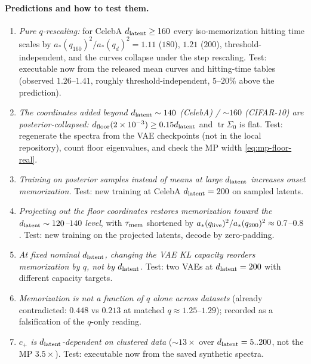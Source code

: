 \paragraph{Predictions and how to test them.}
\begin{enumerate}
\item \emph{Pure $q$-rescaling:} for CelebA $d_{\mathrm{latent}}\ge160$ every iso-memorization hitting time scales by $a_*(q_{160})^2/a_*(q_d)^2=1.11$ ($180$), $1.21$ ($200$), threshold-independent, and the curves collapse under the step rescaling. Test: executable now from the released mean curves and hitting-time tables (observed $1.26$--$1.41$, roughly threshold-independent, $5$--$20\%$ above the prediction).
\item \emph{The coordinates added beyond $d_{\mathrm{latent}}\sim140$ (CelebA) / $\sim160$ (CIFAR-10) are posterior-collapsed:} $d_{\mathrm{floor}}(2\times10^{-3})\ge0.15d_{\mathrm{latent}}$ and $\operatorname{tr}\Sigma_0$ is flat. Test: regenerate the spectra from the VAE checkpoints (not in the local repository), count floor eigenvalues, and check the MP width \eqref{eq:mp-floor-real}.
\item \emph{Training on posterior samples instead of means at large $d_{\mathrm{latent}}$ increases onset memorization.} Test: new training at CelebA $d_{\mathrm{latent}}=200$ on sampled latents.
\item \emph{Projecting out the floor coordinates restores memorization toward the $d_{\mathrm{latent}}\sim120$--$140$ level}, with $\tau_{\mathrm{mem}}$ shortened by $a_*(q_{\rm live})^2/a_*(q_{200})^2\approx0.7$--$0.8$. Test: new training on the projected latents, decode by zero-padding.
\item \emph{At fixed nominal $d_{\mathrm{latent}}$, changing the VAE KL capacity reorders memorization by $q$, not by $d_{\mathrm{latent}}$.} Test: two VAEs at $d_{\mathrm{latent}}=200$ with different capacity targets.
\item \emph{Memorization is not a function of $q$ alone across datasets} (already contradicted: $0.448$ vs $0.213$ at matched $q\approx1.25$--$1.29$); recorded as a falsification of the $q$-only reading.
\item \emph{$c_+$ is $d_{\mathrm{latent}}$-dependent on clustered data} ($\sim13\times$ over $d_{\mathrm{latent}}=5..200$, not the MP $3.5\times$). Test: executable now from the saved synthetic spectra.
\end{enumerate}

